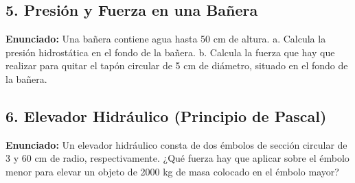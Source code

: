 \documentclass[12pt, letterpaper]{article}
\begin{document}
	
	\subsection*{5. Presión y Fuerza en una Bañera}
	\noindent \textbf{Enunciado:} Una bañera contiene agua hasta 50 cm de altura. a. Calcula la presión hidrostática en el fondo de la bañera. b. Calcula la fuerza que hay que realizar para quitar el tapón circular de 5 cm de diámetro, situado en el fondo de la bañera.
	
	
	\subsection*{6. Elevador Hidráulico (Principio de Pascal)}
	\noindent \textbf{Enunciado:} Un elevador hidráulico consta de dos émbolos de sección circular de 3 y 60 cm de radio, respectivamente. ¿Qué fuerza hay que aplicar sobre el émbolo menor para elevar un objeto de 2000 kg de masa colocado en el émbolo mayor?
	
\end{document}
